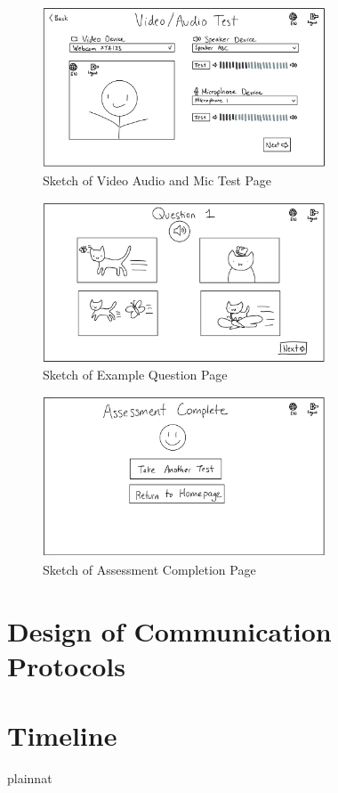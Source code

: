 \documentclass[12pt, titlepage]{article}
\begin{document}
\begin{figure}[H]
  \centering
  \includegraphics[width=0.75\textwidth]{images/SetupTest.png}
  \caption{Sketch of Video Audio and Mic Test Page}
  \label{figVA}
\end{figure}

\begin{figure}[H]
  \centering
  \includegraphics[width=0.75\textwidth]{images/ExampleQuestion.png}
  \caption{Sketch of Example Question Page}
  \label{figEQ}
\end{figure}

\begin{figure}[H]
  \centering
  \includegraphics[width=0.75\textwidth]{images/TestComplete.png}
  \caption{Sketch of Assessment Completion Page}
  \label{figAC}
\end{figure}



\section{Design of Communication Protocols}


\section{Timeline}



 {plainnat}


\newpage{}
\end{document}
